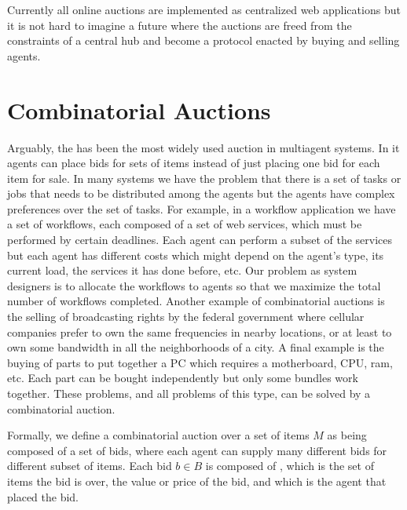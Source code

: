 Currently all online auctions are implemented as centralized web
applications but it is not hard to imagine a future where the auctions
are freed from the constraints of a central hub and become a protocol
enacted by buying and selling agents.

\section{Combinatorial Auctions}
\label{sec:ca}

Arguably, the  has been the most widely used
auction in multiagent systems. In it agents can place bids for sets of
items instead of just placing one bid for each item for sale. In many
systems we have the problem that there is a set of tasks or jobs that
needs to be distributed among the agents but the agents have complex
preferences over the set of tasks. For example, in a workflow
application we have a set of workflows, each composed of a set of web
services, which must be performed by certain deadlines.  Each agent
can perform a subset of the services but each agent has different
costs which might depend on the agent's type, its current load, the
services it has done before, etc. Our problem as system designers is
to allocate the workflows to agents so that we maximize the total
number of workflows completed. Another example of combinatorial
auctions is the selling of broadcasting rights by the federal
government where cellular companies prefer to own the same frequencies
in nearby locations, or at least to own some bandwidth in all the
neighborhoods of a city. A final example is the buying of parts to put
together a PC which requires a motherboard, CPU, ram, etc.  Each part
can be bought independently but only some bundles work together.
These problems, and all problems of this type, can be solved by a
combinatorial auction.

Formally, we define a combinatorial auction over a set of items $M$ as
being composed of a set of bids, where each agent can supply many
different bids for different subset of items. Each bid $b \in B$ is
composed of \bidi{}, which is the set of items the bid is over,
\bidv{} the value or price of the bid, and \bida{} which is the agent
that placed the bid.


